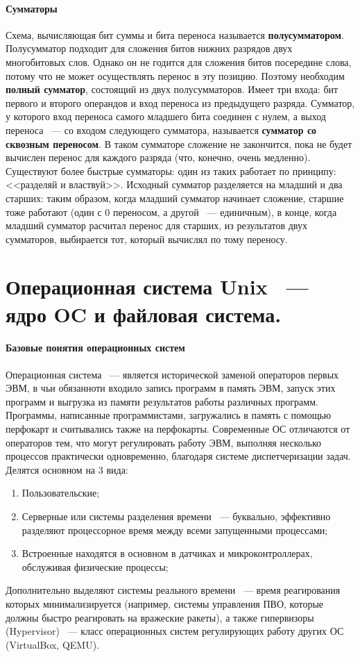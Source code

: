 \documentclass[10pt]{article}
\begin{document}
	\paragraph{Сумматоры}
	Схема, вычисляющая бит суммы и бита переноса называется \textbf{полусумматором}. Полусумматор подходит для сложения битов нижних разрядов двух многобитовых слов. Однако он не годится для сложения битов посередине слова, потому что не может осуществлять перенос в эту позицию. Поэтому необходим \textbf{полный сумматор}, состоящий из двух полусумматоров. Имеет три входа: бит первого и второго операндов и вход переноса из предыдущего разряда. Сумматор, у которого вход переноса самого младшего бита соединен с нулем, а выход переноса ~--- со входом следующего сумматора, называется \textbf{сумматор со сквозным переносом}. В таком сумматоре сложение не закончится, пока не будет вычислен перенос для каждого разряда (что, конечно, очень медленно). Существуют более быстрые сумматоры: один из таких работает по принципу: <<разделяй и властвуй>>. Исходный сумматор разделяется на младший и два старших: таким образом, когда младший сумматор начинает сложение, старшие тоже работают (один с 0 переносом, а другой ~--- единичным), в конце, когда младший сумматор расчитал перенос для старших, из результатов двух сумматоров, выбирается тот, который вычислял по тому переносу.
	\section{Операционная система Unix ~--- ядро OC и файловая система.}
	\paragraph{Базовые понятия операционных систем}
	Операционная система ~--- является исторической заменой операторов первых ЭВМ, в чьи обязанноти входило запись программ в память ЭВМ, запуск этих программ и выгрузка из памяти результатов работы различных программ. Программы, написанные программистами, загружались в память с помощью перфокарт и считывались также на перфокарты. Современные ОС отличаются от операторов тем, что могут регулировать работу ЭВМ, выполняя несколько процессов практически одновременно, благодаря системе диспетчеризации задач. Делятся основном на 3 вида:
	\begin{enumerate}
		\item Пользовательские;
		\item Серверные или системы разделения времени ~--- буквально, эффективно разделяют процессорное время между всеми запущенными процессами;
		\item Встроенные находятся в основном в датчиках и микроконтроллерах, обслуживая физические процессы;
	\end{enumerate}
	Дополнительно выделяют системы реального времени ~--- время реагирования которых минимализируется (например, системы управления ПВО, которые должны быстро реагировать на вражеские ракеты), а также гипервизоры (Hypervisor) ~--- класс операционных систем регулирующих работу других ОС (VirtualBox, QEMU).
\end{document}
